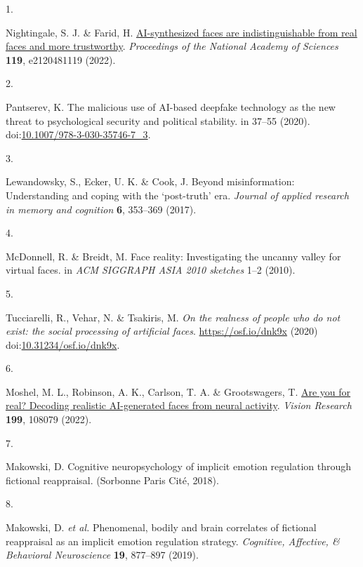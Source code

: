 \documentclass[
  man,floatsintext]{apa6}
\newlength{\cslhangindent}
\newlength{\csllabelwidth}
\newlength{\cslentryspacingunit} %
\newenvironment{CSLReferences}[2] %
 {%
  \setlength{\parindent}{0pt}
  \ifodd #1
  \let\oldpar\par
  \def\par{\hangindent=\cslhangindent\oldpar}
  \fi
  \setlength{\parskip}{#2\cslentryspacingunit}
 }%
 {}
\newcommand{\CSLLeftMargin}[1]{\parbox[t]{\csllabelwidth}{#1}}
\newcommand{\CSLRightInline}[1]{\parbox[t]{\linewidth - \csllabelwidth}{#1}\break}
\begin{document}
\hypertarget{refs}{}
\begin{CSLReferences}{0}{0}
\leavevmode{}%
\CSLLeftMargin{1. }%
\CSLRightInline{Nightingale, S. J. \& Farid, H. \href{https://doi.org/10.1073/pnas.2120481119}{AI-synthesized faces are indistinguishable from real faces and more trustworthy}. \emph{Proceedings of the National Academy of Sciences} \textbf{119}, e2120481119 (2022).}

\leavevmode{}%
\CSLLeftMargin{2. }%
\CSLRightInline{Pantserev, K. The malicious use of AI-based deepfake technology as the new threat to psychological security and political stability. in 37--55 (2020). doi:\href{https://doi.org/10.1007/978-3-030-35746-7_3}{10.1007/978-3-030-35746-7\_3}.}

\leavevmode{}%
\CSLLeftMargin{3. }%
\CSLRightInline{Lewandowsky, S., Ecker, U. K. \& Cook, J. Beyond misinformation: Understanding and coping with the {`post-truth'} era. \emph{Journal of applied research in memory and cognition} \textbf{6}, 353--369 (2017).}

\leavevmode{}%
\CSLLeftMargin{4. }%
\CSLRightInline{McDonnell, R. \& Breidt, M. Face reality: Investigating the uncanny valley for virtual faces. in \emph{ACM SIGGRAPH ASIA 2010 sketches} 1--2 (2010).}

\leavevmode{}%
\CSLLeftMargin{5. }%
\CSLRightInline{Tucciarelli, R., Vehar, N. \& Tsakiris, M. \emph{On the realness of people who do not exist: the social processing of artificial faces}. \url{https://osf.io/dnk9x} (2020) doi:\href{https://doi.org/10.31234/osf.io/dnk9x}{10.31234/osf.io/dnk9x}.}

\leavevmode{}%
\CSLLeftMargin{6. }%
\CSLRightInline{Moshel, M. L., Robinson, A. K., Carlson, T. A. \& Grootswagers, T. \href{https://doi.org/10.1016/j.visres.2022.108079}{Are you for real? Decoding realistic AI-generated faces from neural activity}. \emph{Vision Research} \textbf{199}, 108079 (2022).}

\leavevmode{}%
\CSLLeftMargin{7. }%
\CSLRightInline{Makowski, D. Cognitive neuropsychology of implicit emotion regulation through fictional reappraisal. (Sorbonne Paris Cit{é}, 2018).}

\leavevmode{}%
\CSLLeftMargin{8. }%
\CSLRightInline{Makowski, D. \emph{et al.} Phenomenal, bodily and brain correlates of fictional reappraisal as an implicit emotion regulation strategy. \emph{Cognitive, Affective, \& Behavioral Neuroscience} \textbf{19}, 877--897 (2019).}


\end{CSLReferences}
\end{document}

